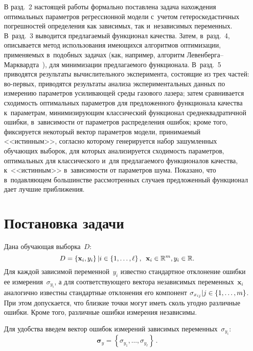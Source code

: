 \begin{multicols}{2}
В разд.~2 настоящей работы формально по\-став\-ле\-на задача нахождения
оптимальных па\-ра\-мет\-ров регрессионной модели с~учетом гетероскедастичных
по\-греш\-но\-стей определения как зависимых, так и~независимых переменных.
В~разд.~3 выводится предлагаемый функционал качества.
Затем, в~разд.~4, описывается метод использования имеющихся
алгоритмов оптимизации, при\-ме\-ня\-емых в~подобных задачах (как, например, алгоритм
Ле\-вен\-бер\-га--Марк\-вард\-та~\cite{Marquardt1963Algorithm}), для минимизации
предлагаемого функционала. В~разд.~5 приводятся результаты
вычислительного эксперимента, со\-сто\-ящие из трех частей: во-пер\-вых,
приводятся результаты анализа экспериментальных данных по измерению
параметров усиливающей среды газового лазера; затем сравнивается сходимость
оптимальных параметров для предложенного функционала качества к~параметрам,
минимизирующим классический функционал среднеквадратичной ошибки,
в~зависимости от па\-ра\-мет\-ров распределения ошибок; кроме того, фиксируется 
некоторый вектор па\-ра\-мет\-ров
модели, принимаемый <<истинным>>, согласно которому генерируется набор
зашумленных обучающих выборок, для которых анализируется сходимость па\-ра\-мет\-ров,
оптимальных для классического и~для предлагаемого функционалов качества,
к~<<истинным>> в~за\-ви\-си\-мости от параметров шума. Показано, что в~подавляющем 
большинстве рассмотренных случаев предложенный функционал дает лучшие приб\-ли\-жения.

\section{Постановка задачи}

Дана обучающая выборка~$D$:
\begin{equation}
  D = \left\{ \mathbf{x}_i, y_i\right \} | i \in \{ 1, \dots, \ell \}\,,\enskip
   \mathbf{x}_i \in  \mathbb{R}^m, y_i \in \mathbb{R}.
  \label{eq:d}
\end{equation}
Для каждой зависимой переменной~$y_i$ известно
стандартное отклонение ошиб\-ки ее измерения~$\sigma_{y_i}$, а для 
соответствующего вектора независимых переменных~$\mathbf{x}_i$ 
аналогично известны стандартные
отклонения его компонент $\sigma_{x_{ij}} | j \hm\in \{ 1, \dots, m \}$.
При этом допускается, что близ\-кие точки могут иметь сколь угодно различные  ошиб\-ки.
Кроме того, различные ошиб\-ки измерения независимы.

Для удобства введем вектор ошибок измерений зависимых переменных~$\sigma_{y_i}$:
$$
  \boldsymbol{\sigma}_y =\left \{ \sigma_{y_1}, \dots, \sigma_{y_{\ell}} \right\}\,.
$$


\end{multicols}
